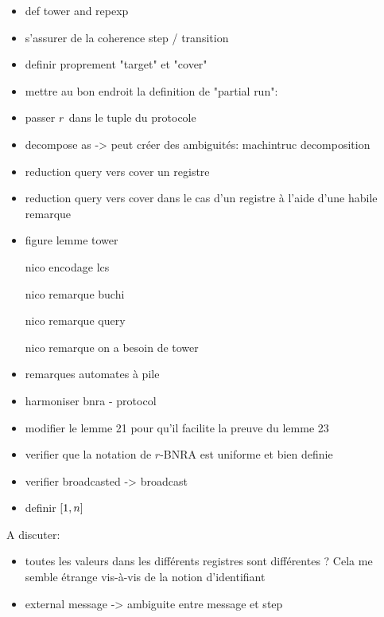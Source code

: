 \begin{itemize}
\item def tower and repexp
\item s'assurer de la coherence step / transition
\item definir proprement "target" et "cover"
\item mettre au bon endroit la definition de "partial run": 
    \item passer $r$ dans le tuple du protocole
    \item decompose as -> peut créer des ambiguités: machintruc decomposition 
    \item reduction query vers cover un registre
    \item reduction query vers cover dans le cas d'un registre à l'aide d'une habile remarque
    \item figure lemme tower
    \item[nico] encodage lcs
    \item[nico] remarque buchi
    \item[nico] remarque query 
    \item[nico] remarque on a besoin de tower
    \item remarques automates à pile    
    \item harmoniser bnra - protocol
    \item modifier le lemme 21 pour qu'il facilite la preuve du lemme 23
    \item verifier que la notation de $r$-BNRA est uniforme et bien definie
    \item  verifier broadcasted -> broadcast
    \item definir $[1,n]$
\end{itemize}

A discuter:
\begin{itemize}
\item toutes les valeurs dans les différents registres sont différentes ? Cela me semble étrange vis-à-vis de la notion d'identifiant
\item external message -> ambiguite entre message et step 
\end{itemize}